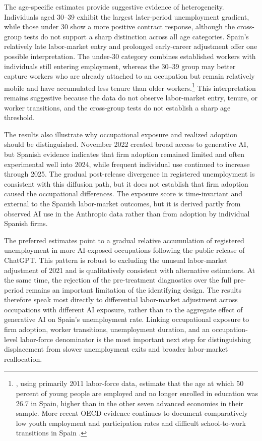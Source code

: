 The age-specific estimates provide suggestive evidence of heterogeneity. Individuals aged 30--39 exhibit the largest later-period unemployment gradient, while those under 30 show a more positive contract response, although the cross-group tests do not support a sharp distinction across all age categories. Spain's relatively late labor-market entry and prolonged early-career adjustment offer one possible interpretation. The under-30 category combines established workers with individuals still entering employment, whereas the 30--39 group may better capture workers who are already attached to an occupation but remain relatively mobile and have accumulated less tenure than older workers.\footnote{\citet{quintini_martin_2014}, using primarily 2011 labor-force data, estimate that the age at which 50 percent of young people are employed and no longer enrolled in education was 26.7 in Spain, higher than in the other seven advanced economies in their sample. More recent OECD evidence continues to document comparatively low youth employment and participation rates and difficult school-to-work transitions in Spain \citep{oecd_spain_2023}.} This interpretation remains suggestive because the data do not observe labor-market entry, tenure, or worker transitions, and the cross-group tests do not establish a sharp age threshold.

The results also illustrate why occupational exposure and realized adoption should be distinguished. November 2022 created broad access to generative AI, but Spanish evidence indicates that firm adoption remained limited and often experimental well into 2024, while frequent individual use continued to increase through 2025. The gradual post-release divergence in registered unemployment is consistent with this diffusion path, but it does not establish that firm adoption caused the occupational differences. The exposure score is time-invariant and external to the Spanish labor-market outcomes, but it is derived partly from observed AI use in the Anthropic data rather than from adoption by individual Spanish firms.

The preferred estimates point to a gradual relative accumulation of registered unemployment in more AI-exposed occupations following the public release of ChatGPT. This pattern is robust to excluding the unusual labor-market adjustment of 2021 and is qualitatively consistent with alternative estimators. At the same time, the rejection of the pre-treatment diagnostics over the full pre-period remains an important limitation of the identifying design. The results therefore speak most directly to differential labor-market adjustment across occupations with different AI exposure, rather than to the aggregate effect of generative AI on Spain's unemployment rate. Linking occupational exposure to firm adoption, worker transitions, unemployment duration, and an occupation-level labor-force denominator is the most important next step for distinguishing displacement from slower unemployment exits and broader labor-market reallocation.

